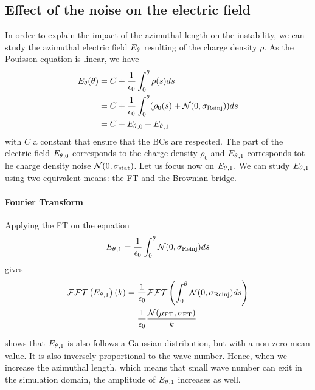   \subsection{Effect of the noise on the electric field}
    \label{sec-mathnoise}
    In order to explain the impact of the azimuthal length on the instability, we can study the azimuthal electric field ${E_{\theta}}$ resulting of the charge density $\rho$.
    As the Pouisson equation is linear, we have
    \begin{align}
      {\ensuremath{E_{\theta}}}(\theta) &= C + \frac{1}{\epsilon_0} \int_0^{\theta} \rho(s) ds\\
                    &= C + \frac{1}{\epsilon_0} \int_0^{\theta} (\rho_0(s) + \mathcal{N}(0, \sigma_{\rm Reinj}) ) ds \\ 
                    &= C + {E_{\theta}}_{, 0} + {E_{\theta}}_{, 1}
    \end{align}
    with $C$ a constant that ensure that the \ac{BC}s are respected.
    The part of the electric field ${E_{\theta}}_{, 0}$ corresponds to the charge density $\rho_0$ and ${E_{\theta}}_{, 1}$  corresponds tot he charge density noise $\mathcal{N}(0, \sigma_{\rm stat})$.
    Let us focus now on ${E_{\theta}}_{, 1}$.
    We can study ${E_{\theta}}_{, 1}$ using two equivalent means: the \ac{FT} and the Brownian bridge.
    
    \paragraph{Fourier Transform \\}
      Applying the \ac{FT} on the equation
      \begin{equation} \label{eq-aziE1}
        {\ensuremath{E_{\theta}}}_{, 1} = \frac{1}{\epsilon_0} \int_0^{\theta}  \mathcal{N}(0, \sigma_{\rm Reinj}) ds
      \end{equation}
      gives    
      \begin{align}
         \mathcal{FFT} \left( {E_{\theta}}_{, 1} \right) (k) &= \frac{1}{\epsilon_0}  \mathcal{FFT} \left( \int_0^{\theta}  \mathcal{N}(0, \sigma_{\rm Reinj}) ds \right) \\
                                     &= \frac{1}{\epsilon_0} \frac{ \mathcal{N}(\mu_{\rm FT}, \sigma_{\rm FT})}{k} \label{eq-fft}
      \end{align}
      
       shows that ${E_{\theta}}_{, 1}$ is also follows a Gaussian distribution, but with a non-zero mean value.
      It is also inversely proportional to the wave number.
      Hence, when we increase the azimuthal length, which means that small wave number can exit in the simulation domain, the amplitude of ${E_{\theta}}_{, 1}$ increases as well.
      
